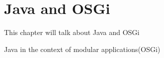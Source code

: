 \chapter{Java and OSGi}
This chapter will talk about Java and OSGi

Java in the context of modular applications(OSGi)

